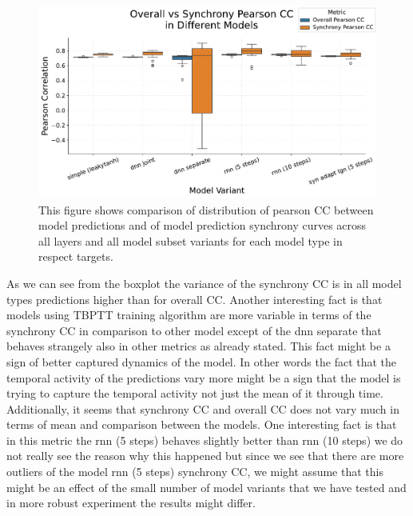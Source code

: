 \begin{figure}
    \centering
    \includegraphics[width=\linewidth]{img/plots/boxplot_model_comparison_synchrony_overall_pearson.pdf}
    \caption{This figure shows comparison of distribution of pearson CC between model predictions and of model prediction synchrony curves across all layers and all model subset variants for each model type in respect targets.}
    \label{fig:boxplot_models_overall_synchrony_pearson_comparison}
\end{figure}

As we can see from the boxplot the variance of the synchrony CC is in all model types predictions higher than for overall CC. Another interesting fact is that models using TBPTT training algorithm are more variable in terms of the synchrony CC in comparison to other model except of the dnn separate that behaves strangely also in other metrics as already stated. This fact might be a sign of better captured dynamics of the model. In other words the fact that the temporal activity of the predictions vary more might be a sign that the model is trying to capture the temporal activity not just the mean of it through time. Additionally, it seems that synchrony CC and overall CC does not vary much in terms of mean and comparison between the models. One interesting fact is that in this metric the rnn (5 steps) behaves slightly better than rnn (10 steps) we do not really see the reason why this happened but since we see that there are more outliers of the model rnn (5 steps) synchrony CC, we might assume that this might be an effect of the small number of model variants that we have tested and in more robust experiment the results might differ.

